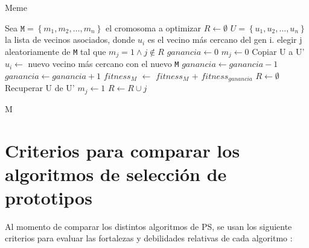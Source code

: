 \begin{algorithm}
\caption{Meme}
\label{meme}
\begin{algorithmic}[1]


\State Sea $\texttt{M} = \left\{ m_1,m_2,\dots,m_n \right\}$ el cromosoma a optimizar 
\State $R \gets \emptyset$
\State $ U = \left\{ u_1,u_2,\dots,u_n \right\}$ la lista de vecinos asociados, donde $u_i$ es el vecino más cercano del gen i. 
	\State elegir j aleatoriamente de \texttt{M} tal que $m_j=1 \land j \notin R$
	\State $ganancia \gets 0$
	\State $m_j \gets 0$
	\State Copiar U a U'
		\State $u_i \gets$ nuevo vecino más cercano con el nuevo \texttt{M}
			\State $ganancia \gets ganancia - 1$
			\State $ganancia \gets ganancia + 1$
		\EndIf
	\EndFor
		\State \emph{$fitness_M$} $\gets$ \emph{$fitness_M$} + \emph{$fitness_{ganancia}$}
		\State $R \gets \emptyset$
	\Else
		\State Recuperar U de U'
		\State $m_j \gets 1$
		\State $ R \gets R \cup j$
	\EndIf
\EndWhile

\State \Return M

\end{algorithmic}
\end{algorithm}

\newpage

\section{Criterios para comparar los algoritmos de selección de prototipos}

Al momento de comparar los distintos algoritmos de PS, se usan los siguiente criterios para evaluar las fortalezas y debilidades relativas de cada algoritmo \cite{garcia2016data}:

